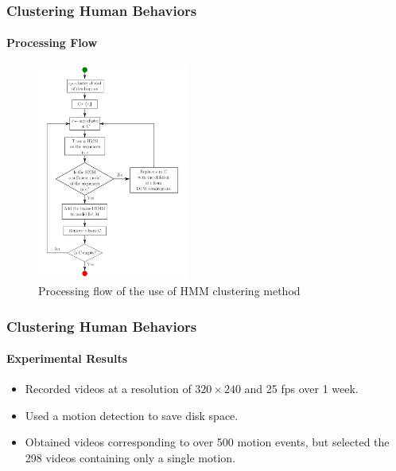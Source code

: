 
\begin{frame}
    \frametitle{Clustering Human Behaviors}
    \framesubtitle{Processing Flow}
    
    \begin{figure}
        \begin{center}
            \includegraphics[height=2.8in]{figures/flow-diagram}
            \vspace{-0.2in}
            \caption{Processing flow of the use of HMM clustering method}
            \label{fig:processing-flow}
        \end{center}
    \end{figure}
    
\end{frame}


\begin{frame}
    \frametitle{Clustering Human Behaviors}
    \framesubtitle{Experimental Results}

    \begin{itemize}
        \item Recorded videos at a resolution of $320 \times 240$ 
            and 25 fps over 1 week.
        \item Used a motion detection to save disk space.
        \item Obtained videos corresponding to over 500 motion 
            events, but selected the 298 videos containing only 
            a single motion.
    \end{itemize}

\end{frame}


